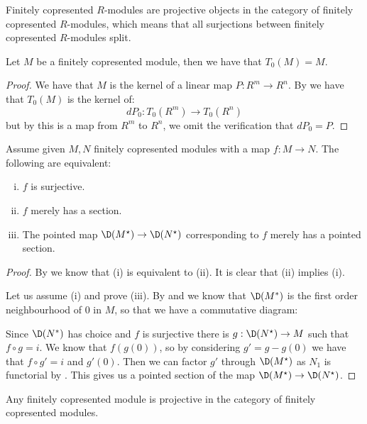Finitely copresented $R$-modules are projective objects in the category of finitely copresented $R$-modules, which means that all surjections between finitely copresented $R$-modules split.

\begin{lemma}\label{tangent-copresented-modules}
Let $M$ be a finitely copresented module, then we have that $T_0(M) = M$.
\end{lemma}

\begin{proof}
We have that $M$ is the kernel of a linear map $P:R^m\to R^n$. By  we have that $T_0(M)$ is the kernel of:
\[dP_0:T_0(R^m)\to T_0(R^n)\]
but by  this is a map from $R^m$ to $R^n$, we omit the verification that $dP_0 = P$.
\end{proof}

\begin{lemma}\label{neighborhood-tangent-correspondence-smooth}
Assume given $M,N$ finitely copresented modules with a map $f:M\to N$. The following are equivalent:
\begin{enumerate}[(i)]
\item $f$ is surjective.
\item $f$ merely has a section.
\item The pointed map $\D(M^\star) \to \D(N^\star)$ corresponding to $f$ merely has a pointed section.
\end{enumerate}
\end{lemma}

\begin{proof}
By  we know that (i) is equivalent to (ii). It is clear that (ii) implies (i).

Let us assume (i) and prove (iii). By  and  we know that $\D(M^*)$ is the first order neighbourhood of $0$ in $M$, so that we have a commutative diagram:
\begin{center}
\end{center}
Since $\D(N^*)$ has choice and $f$ is surjective there is $g:\D(N^\star)\to M$ such that $f\circ g = i$. We know that $f(g(0))$, so by considering $g'=g-g(0)$ we have that $f\circ g' = i$ and $g'(0)$.
Then we can factor $g'$ through $\D(M^\star)$ as $N_1$ is functorial by . This gives us a pointed section of the map $\D(M^\star) \to \D(N^\star)$.
\end{proof}

\begin{corollary}
Any finitely copresented module is projective in the category of finitely copresented modules.
\end{corollary}







